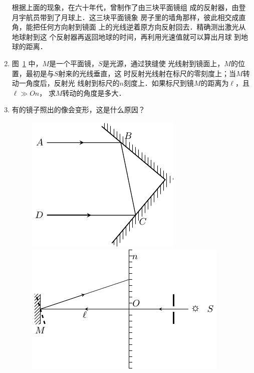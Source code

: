 \begin{enumerate}
    根据上面的现象，在六十年代，曾制作了由三块平面镜组
    成的反射器，由登月宇航员带到了月球上．这三块平面镜象
    房子里的墙角那样，彼此相交成直角，能把任何方向射到镜面
    上的光线逆着原方向反射回去．精确测出激光从地球射到这
    个反射器再返回地球的时间，再利用光速值就可以算出月球
    到地球的距离．
    \item 图~\ref{fig_C_5-13} 中，$M$是一个平面镜，$S$是光源，通过狭缝使
    光线射到镜面上，$M$的位置，最初是与$S$射来的光线垂直，这
    时反射光线射在标尺的零刻度上；当$M$转动一角度后，反射光
    线射到标尺的$n$刻度上．如果标尺到镜$M$的距离为$\ell$，且$\ell\gg On$，
    求$M$转动的角度是多大．
    \item 有的镜子照出的像会变形，这是什么原因？
    \begin{figure}[htbp]
        \centering
        \begin{minipage}[t]{0.48\textwidth}
            \centering
            \includegraphics{fig/C/5-12.pdf}
            \caption{}\label{fig_C_5-12}
        \end{minipage}
        \begin{minipage}[t]{0.48\textwidth}
            \centering
            \includegraphics{fig/C/5-13.pdf}
            \caption{}\label{fig_C_5-13}
        \end{minipage}
    \end{figure}
\end{enumerate}
    
